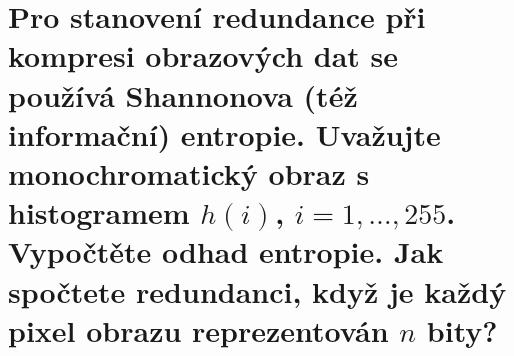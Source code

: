 \section{Pro stanovení redundance při kompresi obrazových dat se používá Shannonova (též informační) entropie. Uvažujte 
monochromatický obraz s histogramem $h(i)$, $i=1,\dots,255$. Vypočtěte odhad entropie. Jak spočtete redundanci, když je 
každý pixel obrazu reprezentován $n$ bity?}